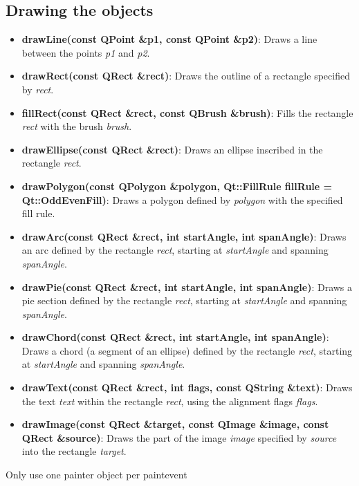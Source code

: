 \documentclass{report}
\begin{document}
    \subsection{Drawing the objects}
    \bigbreak \noindent 
    \begin{itemize}
        \item \textbf{drawLine(const QPoint \&p1, const QPoint \&p2)}: Draws a line between the points \textit{p1} and \textit{p2}.
        \item \textbf{drawRect(const QRect \&rect)}: Draws the outline of a rectangle specified by \textit{rect}.
        \item \textbf{fillRect(const QRect \&rect, const QBrush \&brush)}: Fills the rectangle \textit{rect} with the brush \textit{brush}.
        \item \textbf{drawEllipse(const QRect \&rect)}: Draws an ellipse inscribed in the rectangle \textit{rect}.
        \item \textbf{drawPolygon(const QPolygon \&polygon, Qt::FillRule fillRule = Qt::OddEvenFill)}: Draws a polygon defined by \textit{polygon} with the specified fill rule.
        \item \textbf{drawArc(const QRect \&rect, int startAngle, int spanAngle)}: Draws an arc defined by the rectangle \textit{rect}, starting at \textit{startAngle} and spanning \textit{spanAngle}.
        \item \textbf{drawPie(const QRect \&rect, int startAngle, int spanAngle)}: Draws a pie section defined by the rectangle \textit{rect}, starting at \textit{startAngle} and spanning \textit{spanAngle}.
        \item \textbf{drawChord(const QRect \&rect, int startAngle, int spanAngle)}: Draws a chord (a segment of an ellipse) defined by the rectangle \textit{rect}, starting at \textit{startAngle} and spanning \textit{spanAngle}.
        \item \textbf{drawText(const QRect \&rect, int flags, const QString \&text)}: Draws the text \textit{text} within the rectangle \textit{rect}, using the alignment flags \textit{flags}.
        \item \textbf{drawImage(const QRect \&target, const QImage \&image, const QRect \&source)}: Draws the part of the image \textit{image} specified by \textit{source} into the rectangle \textit{target}.
    \end{itemize}

    \bigbreak \noindent 
    \begin{notebox}
       Only use one painter object per paintevent 
    \end{notebox}
    
\end{document}
